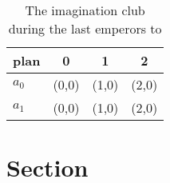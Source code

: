 \documentclass[a4paper]{article}
\begin{document}
\begin{table}
\begin{adjustbox}{width=0.6\columnwidth}
\begin{tabular}{|l|l|l|l|}
\hline
\textbf{plan} & \multicolumn{1}{c|}{\textbf{0}} & \multicolumn{1}{c|}{\textbf{1}} & \multicolumn{1}{c|}{\textbf{2}} \\ \hline
\textbf{$a_0$}  & (0,0) & (1,0) & (2,0) \\ \hline
\textbf{$a_1$}  & (0,0) & (1,0) & (2,0) \\ \hline
\end{tabular}
\end{adjustbox}
\caption{The imagination club during the last emperors to 
}
\end{table}

\section{Section}
\end{document}

